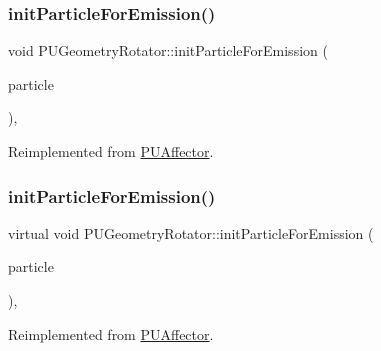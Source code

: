 \subsubsection{\texorpdfstring{init\+Particle\+For\+Emission()}{initParticleForEmission()}\hspace{0.1cm}{\footnotesize\ttfamily [1/2]}}
{\footnotesize\ttfamily void P\+U\+Geometry\+Rotator\+::init\+Particle\+For\+Emission (\begin{DoxyParamCaption}\item[{\hyperlink{structPUParticle3D}{P\+U\+Particle3D} $\ast$}]{particle }\end{DoxyParamCaption})\hspace{0.3cm}{\ttfamily [override]}, {\ttfamily [virtual]}}







Reimplemented from \hyperlink{classPUAffector}{P\+U\+Affector}.

\mbox{\label{classPUGeometryRotator_a83d85244ee812af406d5cc81931dd5eb}} 
\subsubsection{\texorpdfstring{init\+Particle\+For\+Emission()}{initParticleForEmission()}\hspace{0.1cm}{\footnotesize\ttfamily [2/2]}}
{\footnotesize\ttfamily virtual void P\+U\+Geometry\+Rotator\+::init\+Particle\+For\+Emission (\begin{DoxyParamCaption}\item[{\hyperlink{structPUParticle3D}{P\+U\+Particle3D} $\ast$}]{particle }\end{DoxyParamCaption})\hspace{0.3cm}{\ttfamily [override]}, {\ttfamily [virtual]}}







Reimplemented from \hyperlink{classPUAffector}{P\+U\+Affector}.

\mbox{\label{classPUGeometryRotator_a7245251b9b42b431685bca5a6066caff}} 
